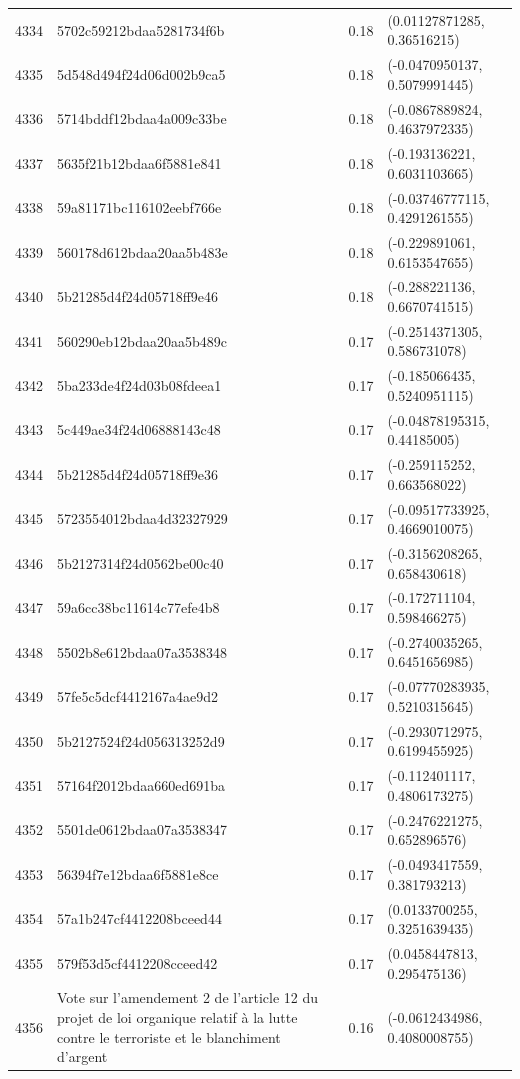 \begin{table}[ht]
\begin{tabular}{rlrl}
  4334 & 5702c59212bdaa5281734f6b & 0.18 & (0.01127871285, 0.36516215) \\ 
  4335 & 5d548d494f24d06d002b9ca5 & 0.18 & (-0.0470950137, 0.5079991445) \\ 
  4336 & 5714bddf12bdaa4a009c33be & 0.18 & (-0.0867889824, 0.4637972335) \\ 
  4337 & 5635f21b12bdaa6f5881e841 & 0.18 & (-0.193136221, 0.6031103665) \\ 
  4338 & 59a81171bc116102eebf766e & 0.18 & (-0.03746777115, 0.4291261555) \\ 
  4339 & 560178d612bdaa20aa5b483e & 0.18 & (-0.229891061, 0.6153547655) \\ 
  4340 & 5b21285d4f24d05718ff9e46 & 0.18 & (-0.288221136, 0.6670741515) \\ 
  4341 & 560290eb12bdaa20aa5b489c & 0.17 & (-0.2514371305, 0.586731078) \\ 
  4342 & 5ba233de4f24d03b08fdeea1 & 0.17 & (-0.185066435, 0.5240951115) \\ 
  4343 & 5c449ae34f24d06888143c48 & 0.17 & (-0.04878195315, 0.44185005) \\ 
  4344 & 5b21285d4f24d05718ff9e36 & 0.17 & (-0.259115252, 0.663568022) \\ 
  4345 & 5723554012bdaa4d32327929 & 0.17 & (-0.09517733925, 0.4669010075) \\ 
  4346 & 5b2127314f24d0562be00c40 & 0.17 & (-0.3156208265, 0.658430618) \\ 
  4347 & 59a6cc38bc11614c77efe4b8 & 0.17 & (-0.172711104, 0.598466275) \\ 
  4348 & 5502b8e612bdaa07a3538348 & 0.17 & (-0.2740035265, 0.6451656985) \\ 
  4349 & 57fe5c5dcf4412167a4ae9d2 & 0.17 & (-0.07770283935, 0.5210315645) \\ 
  4350 & 5b2127524f24d056313252d9 & 0.17 & (-0.2930712975, 0.6199455925) \\ 
  4351 & 57164f2012bdaa660ed691ba & 0.17 & (-0.112401117, 0.4806173275) \\ 
  4352 & 5501de0612bdaa07a3538347 & 0.17 & (-0.2476221275, 0.652896576) \\ 
  4353 & 56394f7e12bdaa6f5881e8ce & 0.17 & (-0.0493417559, 0.381793213) \\ 
  4354 & 57a1b247cf4412208bceed44 & 0.17 & (0.0133700255, 0.3251639435) \\ 
  4355 & 579f53d5cf4412208cceed42 & 0.17 & (0.0458447813, 0.295475136) \\ 
  4356 & Vote sur l'amendement 2 de l'article 12 du projet de loi organique relatif à la lutte contre le terroriste et le blanchiment d'argent & 0.16 & (-0.0612434986, 0.4080008755) \\ 

\end{tabular}
\end{table}
